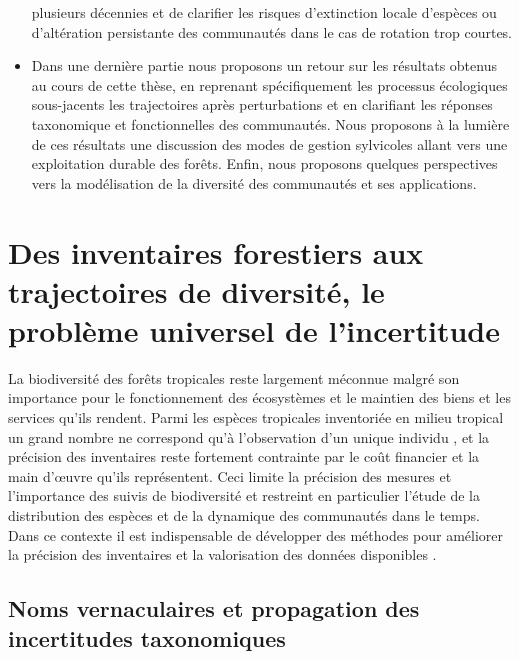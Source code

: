 \documentclass[
  11pt,
  french,
  A4paper,
  extrafontsizes,onecolumn,openright
  ]{memoir}
\begin{document}
\begin{itemize}
  plusieurs décennies et de clarifier les risques d'extinction locale
  d'espèces ou d'altération persistante des communautés dans le cas de
  rotation trop courtes.
\item
  Dans une dernière partie nous proposons un retour sur les résultats
  obtenus au cours de cette thèse, en reprenant spécifiquement les
  processus écologiques sous-jacents les trajectoires après
  perturbations et en clarifiant les réponses taxonomique et
  fonctionnelles des communautés. Nous proposons à la lumière de ces
  résultats une discussion des modes de gestion sylvicoles allant vers
  une exploitation durable des forêts. Enfin, nous proposons quelques
  perspectives vers la modélisation de la diversité des communautés et
  ses applications.
\end{itemize}

\chapter{Des inventaires forestiers aux trajectoires de diversité, le
problème universel de
l'incertitude}\label{des-inventaires-forestiers-aux-trajectoires-de-diversite-le-probleme-universel-de-lincertitude}

La biodiversité des forêts tropicales reste largement méconnue malgré
son importance pour le fonctionnement des écosystèmes et le maintien des
biens et les services qu'ils rendent. Parmi les espèces tropicales
inventoriée en milieu tropical un grand nombre ne correspond qu'à
l'observation d'un unique individu \autocite{Feeley2011}, et la
précision des inventaires reste fortement contrainte par le coût
financier et la main d'œuvre qu'ils représentent. Ceci limite la
précision des mesures et l'importance des suivis de biodiversité et
restreint en particulier l'étude de la distribution des espèces et de la
dynamique des communautés dans le temps. Dans ce contexte il est
indispensable de développer des méthodes pour améliorer la précision des
inventaires et la valorisation des données disponibles
\autocite{Baraloto2012}.

\section{Noms vernaculaires et propagation des incertitudes
taxonomiques}\label{noms-vernaculaires-et-propagation-des-incertitudes-taxonomiques}
\end{document}
